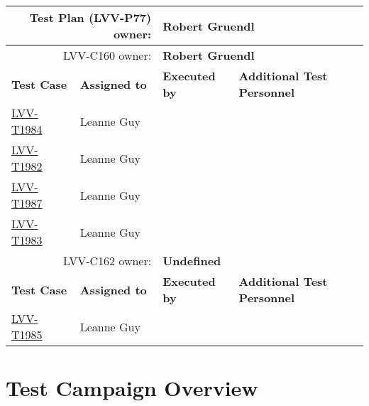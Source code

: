 \documentclass[DM,lsstdraft,STR,toc]{lsstdoc}
\begin{document}
\begin{longtable}{p{3cm}p{3cm}p{3cm}p{6cm}}
\hline
\multicolumn{2}{r}{Test Plan (LVV-P77) owner:} &
\multicolumn{2}{l}{\textbf{ Robert Gruendl } }\\\hline
\multicolumn{2}{r}{ LVV-C160 owner:} &
\multicolumn{2}{l}{\textbf{
    Robert Gruendl
}
} \\\hline
\textbf{Test Case} & \textbf{Assigned to} & \textbf{Executed by} & \textbf{Additional Test Personnel} \\ \hline
\href{https://jira.lsstcorp.org/secure/Tests.jspa#/testCase/LVV-T1984}{LVV-T1984}
& {\small Leanne Guy } & {\small  } &
\begin{minipage}[]{6cm}
\smallskip
{\small  }
\medskip
\end{minipage}
\\ \hline
\href{https://jira.lsstcorp.org/secure/Tests.jspa#/testCase/LVV-T1982}{LVV-T1982}
& {\small Leanne Guy } & {\small  } &
\begin{minipage}[]{6cm}
\smallskip
{\small  }
\medskip
\end{minipage}
\\ \hline
\href{https://jira.lsstcorp.org/secure/Tests.jspa#/testCase/LVV-T1987}{LVV-T1987}
& {\small Leanne Guy } & {\small  } &
\begin{minipage}[]{6cm}
\smallskip
{\small  }
\medskip
\end{minipage}
\\ \hline
\href{https://jira.lsstcorp.org/secure/Tests.jspa#/testCase/LVV-T1983}{LVV-T1983}
& {\small Leanne Guy } & {\small  } &
\begin{minipage}[]{6cm}
\smallskip
{\small  }
\medskip
\end{minipage}
\\ \hline
\multicolumn{2}{r}{ LVV-C162 owner:} &
\multicolumn{2}{l}{\textbf{
    Undefined
}
} \\\hline
\textbf{Test Case} & \textbf{Assigned to} & \textbf{Executed by} & \textbf{Additional Test Personnel} \\ \hline
\href{https://jira.lsstcorp.org/secure/Tests.jspa#/testCase/LVV-T1985}{LVV-T1985}
& {\small Leanne Guy } & {\small  } &
\begin{minipage}[]{6cm}
\smallskip
{\small  }
\medskip
\end{minipage}
\\ \hline
\end{longtable}

\newpage

\section{Test Campaign Overview}
\label{sect:overview}
\end{document}
